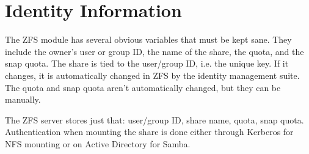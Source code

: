 \section{Identity Information}

The ZFS module has several obvious variables that must be kept sane. They include the owner's user or group ID, the name of the share, the quota, and the snap quota. The share is tied to the user/group ID, i.e. the unique key. If it changes, it is automatically changed in ZFS by the identity management suite. The quota and snap quota aren't automatically changed, but they can be manually. 

The ZFS server stores just that: user/group ID, share name, quota, snap quota. Authentication when mounting the share is done either through Kerberos for NFS mounting or on Active Directory for Samba. 
